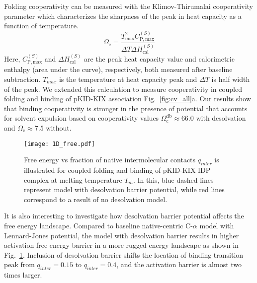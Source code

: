 \documentclass[../talant.diss.submit.tex]{subfiles}
\begin{document}
Folding cooperativity can be
measured 
with the Klimov-Thirumalai cooperativity parameter which characterizes the sharpness of the
peak in heat capacity as a function of temperature. \cite{klimov:98c,li:04f,liu:05} 
%
%
\begin{equation}
  \label{eq:cooper}
  \Omega_{\mathrm{c}} = \frac{T_{\mathrm{max}}^2 C_{\mathrm{P,max}}^{(S)}}{\Delta T \Delta H_{\mathrm{cal}}^{(S)}}
\end{equation}
%
%
Here, $ C_{\mathrm{P,max}}^{(S)}$ and $\Delta H_{\mathrm{cal}}^{(S)}$ are the peak heat capacity value and
calorimetric enthalpy (area under the curve), respectively, both measured after baseline subtraction.
$T_{max}$ is the temperature at heat capacity peak and $\Delta T$ is half width of the peak.
We extended this calculation to measure cooperativity in coupled folding and binding
of pKID-KIX association Fig.~\ref{fig:cv_all}a. Our results show that binding cooperativity
is stronger in the presence of potential that accounts for solvent expulsion based on cooperativity
values $\Omega_{\mathrm{c}}^{\mathrm{db}} \approx 66.0$ with desolvation and $\Omega_{\mathrm{c}} \approx 7.5$ without.


%        
\begin{figure}[h]
  \begin{centering}
    \texttt{[image: 1D\_free.pdf]}
    \caption{Free energy vs fraction of native intermolecular contacts $q_{inter}$ is illustrated
      for coupled folding and binding of pKID-KIX IDP complex at melting temperature $T_m$. In this,
      blue dashed lines represent model with desolvation barrier potential, while red lines correspond
      to a result of no desolvation model.}                
    \label{fig:1D_free}                                                                                  
  \end{centering}                                                                                          
\end{figure}


% 
%

It is also interesting to investigate how desolvation barrier potential affects the free energy
landscape. Compared to baseline native-centric C-$\alpha$ model with Lennard-Jones potential,
the model with desolvation barrier results in higher activation free energy barrier in a more rugged 
energy landscape as shown in Fig.~\ref{fig:1D_free}. Inclusion of desolvation barrier shifts the location
of binding transition peak from $q_{inter}=0.15$ to $q_{inter}=0.4$, and the activation barrier is
almost two times larger.
\end{document}
